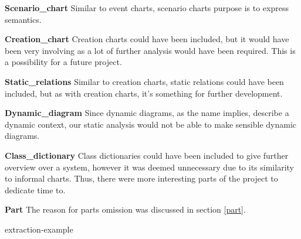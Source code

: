 \noindent\textbf{Scenario\_chart}\newline
Similar to event charts, scenario charts purpose is to express semantics.\newline\newline
  
\noindent\textbf{Creation\_chart}\newline
Creation charts could have been included, but it would have been very involving as a lot of further analysis would have been required. This is a possibility for a future project.\newline\newline
  
\noindent\textbf{Static\_relations}\newline
Similar to creation charts, static relations could have been included, but as with creation charts, it's something for further development.\newline\newline

\noindent\textbf{Dynamic\_diagram}\newline
Since dynamic diagrams, as the name implies, describe a dynamic context, our static analysis would not be able to make sensible dynamic diagrams.\newline\newline

\noindent\textbf{Class\_dictionary}\newline
Class dictionaries could have been included to give further overview over a system, however it was deemed unnecessary due to its similarity to informal charts. Thus, there were more interesting parts of the project to dedicate time to.\newline\newline

\noindent\textbf{Part}
The reason for parts omission was discussed in section \ref{part}.

{extraction-example}
